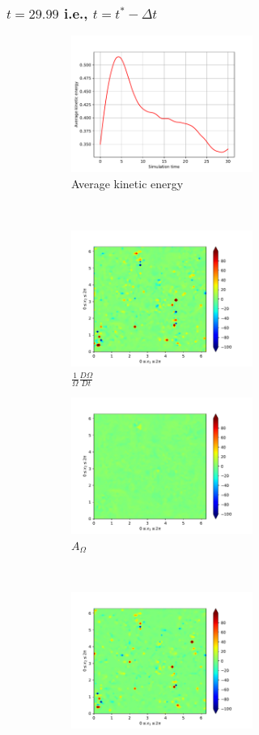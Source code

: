 \subsubsection{$t=29.99$ i.e., $t=t^{\ast} - \Delta t$} 
\begin{figure}[H]
    \begin{subfigure}[H]{0.45\textwidth}
        \includegraphics[height=1.75in]{media/run-cds-65/ke-average1318}
        \caption{Average kinetic energy}
    \end{subfigure}
    ~
    \begin{subfigure}[H]{0.45\textwidth}
        \includegraphics[height=1.75in]{media/run-cds-65/enst-1318}
        \caption{$\frac{1}{\Omega} \frac{D \Omega}{Dt}$}
    \end{subfigure}
    \newline
    \begin{subfigure}{0.45\textwidth}
        \includegraphics[height=1.75in]{media/run-cds-65/A-enst-1318}
        \caption{$A_{\Omega}$}
    \end{subfigure}
    ~
    \begin{subfigure}{0.45\textwidth}
        \includegraphics[height=1.75in]{media/run-cds-65/Pi-enst-1318}

\end{subfigure}
\end{figure}
